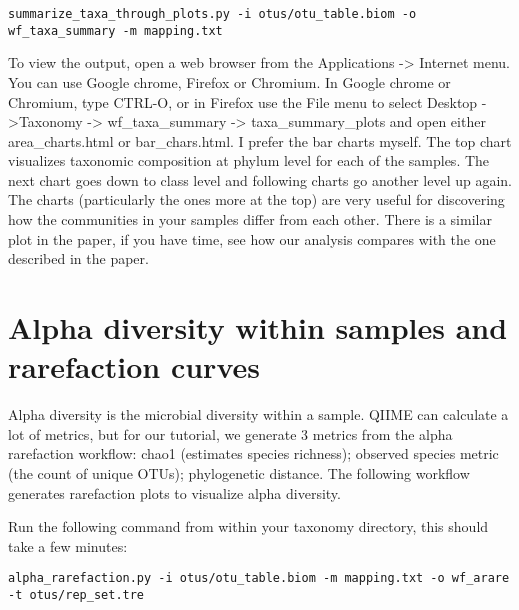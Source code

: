 \begin{steps}

\begin{lstlisting}[style=command_syntax]
summarize_taxa_through_plots.py -i otus/otu_table.biom -o  wf_taxa_summary -m mapping.txt 

\end{lstlisting}
\end{steps}

\begin{steps}
To view the output, open a web browser from the Applications -> Internet menu. You can use Google chrome, Firefox or Chromium.
In Google chrome or Chromium, type CTRL-O, or in Firefox use the File menu to select Desktop ->Taxonomy -> wf\_taxa\_summary -> taxa\_summary\_plots and open either area\_charts.html or bar\_chars.html. I prefer the bar charts myself. The top chart visualizes taxonomic composition at phylum level for each of the samples. The next chart goes down to class level and following charts go another level up again. The charts (particularly the ones more at the top) are very useful for discovering how the communities in your samples differ from each other. There is a similar plot in the paper, if you have time, see how our analysis compares with the one described in the paper.

\end{steps}

\section{Alpha diversity within samples and rarefaction curves}

Alpha diversity is the microbial diversity within a sample. QIIME can calculate a lot of metrics, but for our tutorial, we generate 3 metrics from the alpha rarefaction workflow: chao1 (estimates species richness); observed species metric (the count of unique OTUs); phylogenetic distance. The following workflow generates rarefaction plots to visualize alpha diversity.

\begin{steps}
Run the following command from within your taxonomy directory, this should take a few minutes:
\begin{lstlisting}
alpha_rarefaction.py -i otus/otu_table.biom -m mapping.txt -o wf_arare -t otus/rep_set.tre
\end{lstlisting}
\end{steps}

